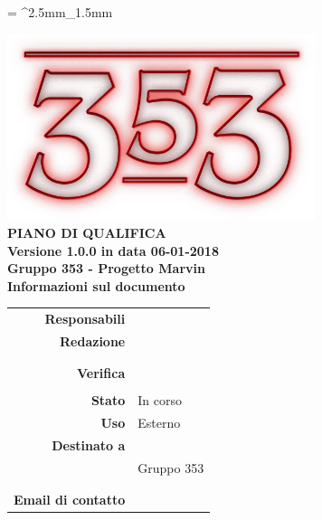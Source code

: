\documentclass[openany, a4paper, 12pt]{report}
\begin{document}
	
	\tabulinesep = ^2.5mm_1.5mm
	
	\begin{titlepage}
		\centering
		\vfill
		{
			\bfseries
			\vskip2cm
			\includegraphics[width=9cm]{../../common/images/logo.png} \\
			\vfill
			\Huge{PIANO DI QUALIFICA}\\
			\vfill
			\Large Versione 1.0.0 in data 06-01-2018\\
			\large Gruppo 353 - Progetto Marvin\\
			\vfill
			\normalsize Informazioni sul documento\\
			\begin{table}[htbp]
				\centering
				\renewcommand\arraystretch{1.2}
				\begin{tabular}{r|l}
					\hline
					\textbf{Responsabili}	& \Parwinder \\
					
					\textbf{Redazione} 		& \Elena \\
											& \Gianluca \\
											& \Valentina \\
											
					\textbf{Verifica} 		& \Riccardo \\	
											& \Davide \\
											
					\textbf{Stato} 			& In corso\\
					\textbf{Uso}			& Esterno\\
					\textbf{Destinato a}   	& \Proponente\\
					& Gruppo 353\\
					& \Vardanega\\
					& \Cardin\\
					
					\textbf{Email di contatto}	& \mailgroup
				\end{tabular}
			\end{table}
			\vfill
		}    
	\end{titlepage}
	
	\tableofcontents
	\listoffigures
	\listoftables
	\newpage
	
	
	
	
	
	
	
	
	
	
\end{document}
